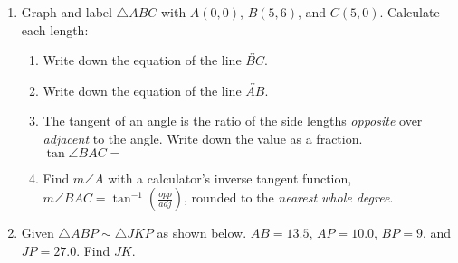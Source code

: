 \documentclass[12pt, twoside]{article}
\begin{document}
\begin{enumerate}
\newpage
\item Graph and label $\triangle ABC$ with $A(0,0)$, $B(5,6)$, and $C(5,0)$. Calculate each length:
  \begin{enumerate}[itemsep=1.4cm]
    \item Write down the equation of the line $\overleftrightarrow{BC}$.
    \item Write down the equation of the line $\overleftrightarrow{AB}$. 
    \item The tangent of an angle is the ratio of the side lengths \emph{opposite} over \emph{adjacent} to the angle. Write down the value as a fraction. \\[0.5cm]
      $\tan \angle BAC=$
    \item Find $m\angle A$ with a calculator's inverse tangent function, $\displaystyle m \angle BAC = \tan^{-1}(\frac{opp}{adj})$, rounded to the \emph{nearest whole degree}.
    \vspace{2cm}
  \end{enumerate}

\newpage
\item Given $\triangle ABP \sim \triangle JKP$ as shown below. $AB=13.5$, $AP=10.0$, $BP=9$, and $JP=27.0$. Find $JK$.
  \begin{flushright}
    \end{flushright}
    \vspace{0.5cm}
    

\end{enumerate}
\end{document}
